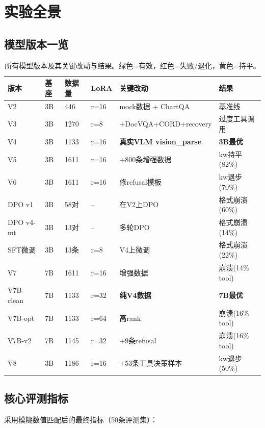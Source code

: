 \documentclass[fontset=none,11pt,a4paper]{ctexart}
\begin{document}
\section{实验全景}

\subsection{模型版本一览}

\begin{table}[htbp]
\centering
\begin{tabular}{lllllp{3cm}}
\toprule
版本 & 基座 & 数据量 & LoRA & 关键改动 & 结果 \\
\midrule
V2 & 3B & 446 & r=16 & mock数据 + ChartQA & 基准线 \\
V3 & 3B & 1270 & r=8 & +DocVQA+CORD+recovery & 过度工具调用 \\
V4 & 3B & 1133 & r=16 & \textbf{真实VLM vision\_parse} & \textbf{3B最优} \\
V5 & 3B & 1611 & r=16 & +800条增强数据 & kw持平(82\%) \\
V6 & 3B & 1611 & r=16 & 修refusal模板 & kw退步(70\%) \\
\addlinespace
DPO v1 & 3B & 58对 & -- & 在V2上DPO & 格式崩溃(60\%) \\
DPO v4-mt & 3B & 13对 & -- & 多轮DPO & 格式崩溃(14\%) \\
SFT微调 & 3B & 13条 & r=8 & V4上微调 & 格式崩溃(22\%) \\
\addlinespace
V7 & 7B & 1611 & r=16 & 增强数据 & 崩溃(14\% tool) \\
V7B-clean & 7B & 1133 & r=32 & \textbf{纯V4数据} & \textbf{7B最优} \\
V7B-opt & 7B & 1133 & r=64 & 高rank & 崩溃(16\% tool) \\
V7B-v2 & 7B & 1145 & r=32 & +9条refusal & 崩溃(16\% tool) \\
\addlinespace
V8 & 3B & 1186 & r=16 & +53条工具决策样本 & kw退步(50\%) \\
\bottomrule
\end{tabular}
\caption{所有模型版本及其关键改动与结果。绿色=有效，红色=失败/退化，黄色=持平。}
\label{tab:models}
\end{table}

\subsection{核心评测指标}

采用模糊数值匹配后的最终指标（50条评测集）：
\end{document}
